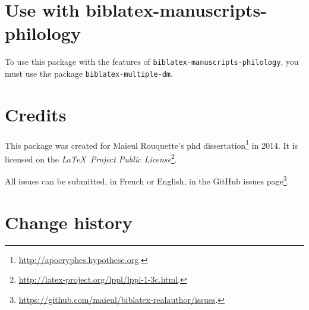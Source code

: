 \documentclass{ltxdockit}[2011/03/25]
\begin{document}
\section{Use with biblatex-manuscripts-philology}

To use this package with the features of \verb+biblatex-manuscripts-philology+, you must use the package \verb+biblatex-multiple-dm+.

\section{Credits}

This package was created for Maïeul Rouquette's phd dissertation\footnote{\url{http://apocryphes.hypothese.org}.} in 2014. It is licensed on the \emph{\LaTeX\ Project Public License}\footnote{\url{http://latex-project.org/lppl/lppl-1-3c.html}.}.


All issues can be submitted, in French or English, in the GitHub issues page\footnote{\url{https://github.com/maieul/biblatex-realauthor/issues}.}.

\section{Change history}
\end{document}
